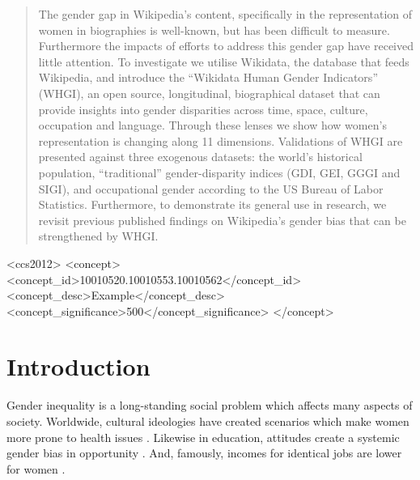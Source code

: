 \documentclass{sig-alternate-05-2015}
\begin{document}
\maketitle
\begin{abstract}
The gender gap in Wikipedia's content, specifically in the representation of women in biographies is well-known, but has been difficult to measure. Furthermore the impacts of efforts to address this gender gap have received little attention. To investigate we utilise Wikidata, the database that feeds Wikipedia, and introduce the ``Wikidata Human Gender Indicators'' (WHGI), an open source, longitudinal, biographical dataset that can provide insights into gender disparities across time, space, culture, occupation and language. Through these lenses we show how women's representation is changing along 11 dimensions. Validations of WHGI are presented against three exogenous datasets: the world's historical population, ``traditional'' gender-disparity indices (GDI, GEI, GGGI and SIGI), and occupational gender according to the US Bureau of Labor Statistics. Furthermore, to demonstrate its general use in research, we revisit previous published findings on Wikipedia's gender bias that can be strengthened by WHGI. 
\end{abstract}


%
%
\begin{CCSXML}
<ccs2012>
 <concept>
  <concept_id>10010520.10010553.10010562</concept_id>
  <concept_desc>Example</concept_desc>
  <concept_significance>500</concept_significance>
 </concept>

\end{CCSXML}



%
%

%
%
\printccsdesc



\section{Introduction}

Gender inequality is a long-standing social problem which affects many aspects of society. Worldwide, cultural ideologies have created scenarios which make women more prone to health issues \cite{world_health_organization_women_2009}. Likewise in education, attitudes create a systemic gender bias in opportunity \cite{heward_gender_1999}. And, famously, incomes for identical jobs are lower for women \cite{burstein_equal_????}.
\end{document}
